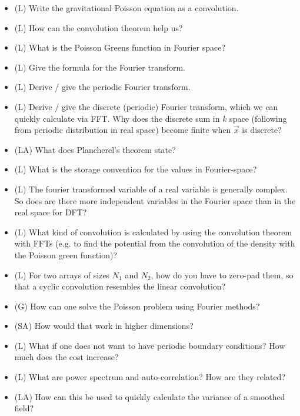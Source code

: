 \begin{itemize}
    \item (L) Write the gravitational Poisson equation as a convolution.
    \answerboxM
    \item (L) How can the convolution theorem help us?
    \answerboxM
    \item (L) What is the Poisson Greens function in Fourier space?
    \answerboxS
    \item (L) Give the formula for the Fourier transform. 
    \answerboxM
    \item (L) Derive / give the periodic Fourier transform.
    \answerboxM
    \item (L) Derive / give the discrete (periodic) Fourier transform, which we can quickly calculate via FFT.
    Why does the discrete sum in $k$ space (following from periodic distribution in real space) become finite when $\vec{x}$ is discrete?
    \answerboxM
    \item (LA) What does Plancherel's theorem state?
    \answerboxS
    \item (L) What is the storage convention for the values in Fourier-space?
    \answerboxM
    \item (L) The fourier transformed variable of a real variable is generally complex.
    So does are there more independent variables in the Fourier space than in the real space for DFT?
    \answerboxM
    \item (L) What kind of convolution is calculated by using the convolution theorem with FFTs
    (e.g. to find the potential from the convolution of the density with the Poisson green function)?
    \answerboxM
    \item (L) For two arrays of sizes $N_1$ and $N_2$, how do you have to zero-pad them, so that
    a cyclic convolution resembles the linear convolution?
    \answerboxM
    \item (G) How can one solve the Poisson problem using Fourier methods?
    \answerboxM
    \item (SA) How would that work in higher dimensions?
    \answerboxM
    \item (L) What if one does not want to have periodic boundary conditions? How much does the cost increase?
    \answerboxM
    \item (L) What are power spectrum and auto-correlation? How are they related?
    \answerboxM
    \item (LA) How can this be used to quickly calculate the variance of a smoothed field?
    \answerboxM

\end{itemize}
